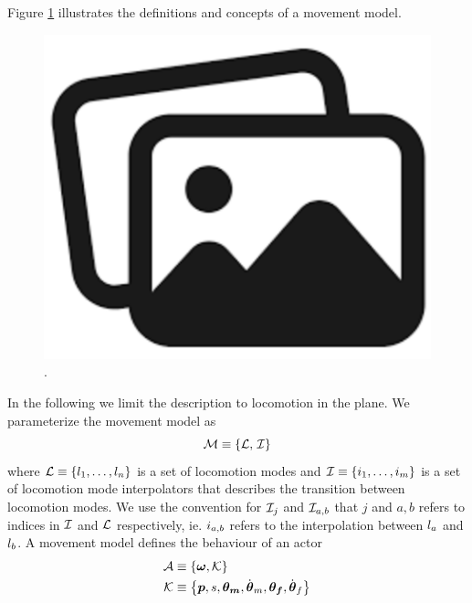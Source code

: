 Figure \ref{fig:movement:model} illustrates the definitions and concepts of a movement model.
\begin{figure}
    \centering
    \includegraphics[width=0.75\columnwidth]{img/temporary.png}
    \caption{.}
    \label{fig:movement:model}
\end{figure}
In the following we limit  the description to locomotion in the plane. We parameterize the movement model as 
\begin{equation}
    \label{eq:model:parameterization}
 \mathcal{M} \equiv 
 \left\{ \mathcal{L},\,\mathcal{I} \right\}
\end{equation}
where $\mathcal{L} \equiv \left\{  l_1, \ldots, l_n \right\}$ is a set of locomotion modes and $\mathcal{I} \equiv \left\{  i_1, \ldots, i_m \right\}$ is a set of locomotion mode interpolators that describes the transition between locomotion modes. We use the convention for $\mathcal{I}_j$ and $\mathcal{I}_{a,b}$ that $j$ and $a,b$ refers to indices in $\mathcal{I}$ and $\mathcal{L}$ respectively, ie. $i_{a,b}$ refers to the interpolation between $l_a$ and $l_b$. A movement model defines the behaviour of an actor 
\begin{subequations}
\begin{align}
    \label{eq:actor:def}
    \mathcal{A} 
    &\equiv
    \left\{ 
        \boldsymbol{\omega }, \mathcal{K} 
         \right\}\\
    \mathcal{K}
    &\equiv
    \left\{ 
        \boldsymbol{p }, s, \boldsymbol{\theta_m }, \dot{\boldsymbol{\theta }}_m, {\boldsymbol{\theta_f }}, \dot{\boldsymbol{\theta }}_f 
         \right\}\\
\end{align}
\end{subequations}
